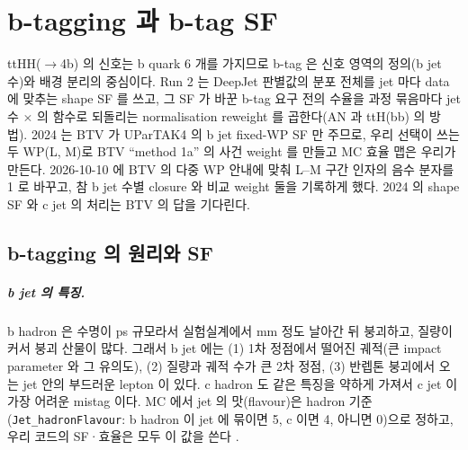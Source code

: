 \chapter{b-tagging 과 b-tag SF}\label{ch:btag}

ttHH($\to$4b) 의 신호는 b quark 6 개를 가지므로 b-tag 은 신호 영역의 정의(b jet 수)와 배경 분리의 중심이다. Run 2 는 DeepJet 판별값의
분포 전체를 jet 마다 data 에 맞추는 shape SF 를 쓰고, 그 SF 가 바꾼 b-tag 요구 전의 수율을 과정 묶음마다 jet 수 $\times$ \HT{} 의 함수로
되돌리는 normalisation reweight 를 곱한다(AN 과 ttH(bb) 의 방법). 2024 는 BTV 가 UParTAK4 의 b jet fixed-WP SF 만 주므로, 우리 선택이
쓰는 두 WP(L, M)로 BTV ``method 1a'' 의 사건 weight 를 만들고 MC 효율 맵은 우리가 만든다. 2026-10-10 에 BTV 의 다중 WP 안내에 맞춰
L–M 구간 인자의 음수 분자를 1 로 바꾸고, 참 b jet 수별 closure 와 비교 weight 둘을 기록하게 했다. 2024 의 shape SF 와 c jet 의 처리는
BTV 의 답을 기다린다.

\section{b-tagging 의 원리와 SF}\label{sec:btag-theory}

\paragraph{b jet 의 특징.}
b hadron 은 수명이 ps 규모라서 실험실계에서 mm 정도 날아간 뒤 붕괴하고, 질량이 커서 붕괴 산물이 많다. 그래서 b jet 에는 (1) 1차 정점에서
떨어진 궤적(큰 impact parameter 와 그 유의도), (2) 질량과 궤적 수가 큰 2차 정점, (3) 반렙톤 붕괴에서 오는 jet 안의 부드러운 lepton 이 있다.
c hadron 도 같은 특징을 약하게 가져서 c jet 이 가장 어려운 mistag 이다. MC 에서 jet 의 맛(flavour)은 hadron 기준(\texttt{Jet\_hadronFlavour}:
b hadron 이 jet 에 묶이면 5, c 이면 4, 아니면 0)으로 정하고, 우리 코드의 SF·효율은 모두 이 값을 쓴다
.

